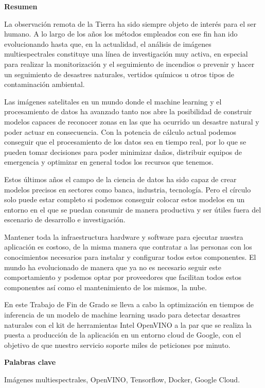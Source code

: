 \cleardoublepage
\begin{center}

{\bf \Huge Resumen}

\end{center}

La observación remota de la Tierra ha sido siempre objeto de interés para el ser humano.
A lo largo de los años los métodos empleados con ese fin han ido evolucionando hasta que, en la actualidad, el análisis de imágenes multiespectrales constituye una línea de
investigación muy activa, en especial para realizar la monitorización y el seguimiento de incendios o prevenir y hacer un seguimiento de desastres naturales, vertidos químicos
u otros tipos de contaminación ambiental.

Las imágenes satelitales en un mundo donde el machine learning y el procesamiento de datos ha avanzado tanto nos abre la posibilidad de construir modelos capaces de reconocer zonas
en las que ha ocurrido un desastre natural y poder actuar en consecuencia.
Con la potencia de cálculo actual podemos conseguir que el procesamiento de los datos sea en tiempo real, por lo que se pueden tomar decisiones para poder minimizar daños, distribuir
equipos de emergencia y optimizar en general todos los recursos que tenemos.

Estos últimos años el campo de la ciencia de datos ha sido capaz de crear modelos precisos en sectores como banca, industria, tecnología.
Pero el círculo solo puede estar completo si podemos
conseguir colocar estos modelos en un entorno en el que se puedan consumir de manera productiva y ser útiles fuera del escenario de desarrollo e investigación.

Mantener toda la infraestructura hardware y software para ejecutar nuestra aplicación es costoso, de la misma manera que contratar a las personas con los conocimientos necesarios
para instalar y configurar todos estos componentes.
El mundo ha evolucionado de manera que ya no es necesario seguir este comportamiento y podemos optar por proveedores que facilitan todos estos componentes
así como el mantenimiento de los mismos, la nube.

En este Trabajo de Fin de Grado se lleva a cabo la optimización en tiempos de inferencia de un modelo de machine learning usado para detectar desastres naturales con el kit de herramientas Intel OpenVINO a la par que se realiza la puesta a producción de la aplicación en un entorno cloud de Google, con el objetivo de que nuestro servicio soporte miles de peticiones por minuto.

\vspace{0.8cm}
\begin{center}


{\bf \Large Palabras clave}

\end{center}

Imágenes multiespectrales, OpenVINO, Tensorflow, Docker, Google Cloud.

\vspace{0.3cm}